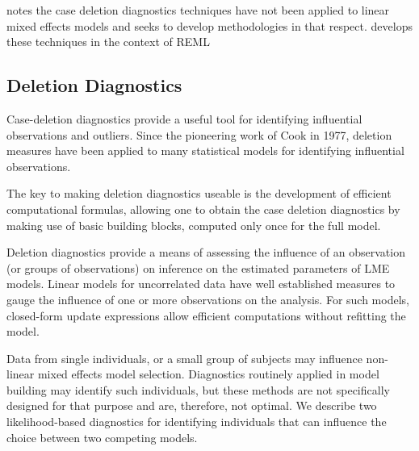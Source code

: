 \documentclass[12pt, a4paper]{report}
\theoremstyle{plain}
\theoremstyle{definition}
\theoremstyle{remark}
\begin{document}
\citet{Christensen} notes the case deletion diagnostics techniques have not been applied to linear mixed effects models and seeks to develop methodologies in that respect. \citet{Christensen} develops these techniques in the context of REML
	
%	
%	

		\subsection{Deletion Diagnostics}
	
Case-deletion diagnostics provide a useful tool for identifying influential observations and outliers. Since the pioneering work of Cook in 1977, deletion measures have been applied to many statistical models for identifying influential observations.
	
The key to making deletion diagnostics useable is the development of efficient computational formulas, allowing one to obtain the  case deletion diagnostics by making use of basic building blocks, computed only once for the full model.
	
	Deletion diagnostics provide a means of assessing the influence of an observation (or groups of observations) on inference on the estimated parameters of LME models. Linear models for uncorrelated data have well established measures to gauge the influence of one or more observations on the analysis. For such models, closed-form update expressions allow efficient computations without refitting the model.
	
	Data from single individuals, or a small group of subjects may influence non-linear mixed effects model selection. Diagnostics routinely applied in model building may identify such individuals, but these methods are not specifically designed for that purpose and are, therefore, not optimal. We describe two likelihood-based diagnostics for identifying individuals that can influence the choice between two competing models.
	
\end{document}
